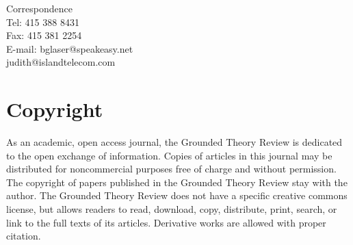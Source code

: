 \noindent
Correspondence\\
Tel: 415 388 8431\\
Fax: 415 381 2254\\
E-mail: bglaser@speakeasy.net\\
judith@islandtelecom.com\\

\section*{Copyright}

As an academic, open access journal,
the Grounded Theory Review is dedicated to the open exchange of information.
Copies of articles in this journal may be distributed for noncommercial purposes
free of charge and without permission.
The copyright of papers published in the Grounded Theory Review stay with the author.
The Grounded Theory Review does not have a specific creative commons license,
but allows readers to read, download, copy, distribute, print, search,
or link to the full texts of its articles.  Derivative works are allowed with proper citation.





